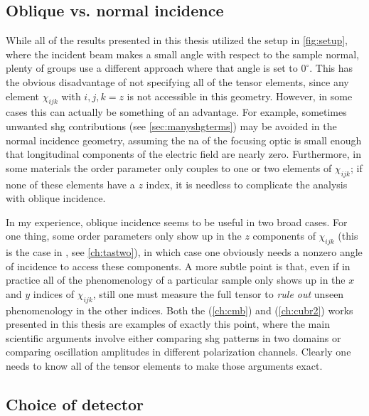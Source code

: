 \subsection{Oblique vs. normal incidence}\label{sec:obliquevsnormal}

While all of the results presented in this thesis utilized the setup in \cref{fig:setup}, where the incident beam makes a small angle with respect to the sample normal, plenty of groups use a different approach where that angle is set to $0^\circ$.
This has the obvious disadvantage of not specifying all of the tensor elements, since any element $\chi_{ijk}$ with $i, j, k = z$ is not accessible in this geometry.
However, in some cases this can actually be something of an advantage.
For example, sometimes unwanted \gls{shg} contributions (see \cref{sec:manyshgterms}) may be avoided in the normal incidence geometry, assuming the \gls{na} of the focusing optic is small enough that longitudinal components of the electric field are nearly zero.
Furthermore, in some materials the order parameter only couples to one or two elements of $\chi_{ijk}$; if none of these elements have a $z$ index, it is needless to complicate the analysis with oblique incidence.

In my experience, oblique incidence seems to be useful in two broad cases.
For one thing, some order parameters only show up in the $z$ components of $\chi_{ijk}$ (this is the case in \tastwo, see \cref{ch:tastwo}), in which case one obviously needs a nonzero angle of incidence to access these components.
A more subtle point is that, even if in practice all of the phenomenology of a particular sample only shows up in the $x$ and $y$ indices of $\chi_{ijk}$, still one must measure the full tensor to \emph{rule out} unseen phenomenology in the other indices.
Both the  (\cref{ch:cmb}) and  (\cref{ch:cubr2}) works presented in this thesis are examples of exactly this point, where the main scientific arguments involve either comparing \gls{shg} patterns in two domains or comparing oscillation amplitudes in different polarization channels.
Clearly one needs to know all of the tensor elements to make those arguments exact.

\subsection{Choice of detector}

